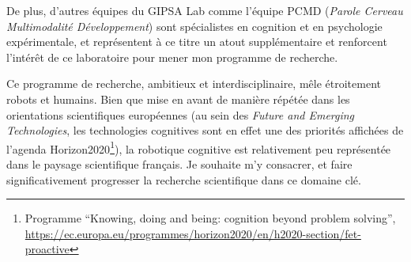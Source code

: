 \documentclass[a4paper]{article}
\begin{document}
De plus, d'autres équipes du GIPSA Lab comme l'équipe PCMD (\emph{Parole
Cerveau Multimodalité Développement}) sont spécialistes en cognition et en
psychologie expérimentale, et représentent à ce titre un atout supplémentaire et
renforcent l'intérêt de ce laboratoire pour mener mon programme de recherche.

\vspace{1em}

Ce programme de recherche, ambitieux et interdisciplinaire, mêle étroitement
robots et humains. Bien que mise en avant de manière répétée dans les
orientations scientifiques européennes (au sein des \emph{Future and Emerging
Technologies}, les technologies cognitives sont en effet une des priorités
affichées de l'agenda Horizon2020\footnote{Programme ``Knowing, doing and being:
cognition beyond problem solving'',
\url{https://ec.europa.eu/programmes/horizon2020/en/h2020-section/fet-proactive}}),
la robotique cognitive est relativement peu représentée dans le paysage
scientifique français. Je souhaite m'y consacrer, et faire significativement
progresser la recherche scientifique dans ce domaine clé.

\printbibliography
\end{document}
